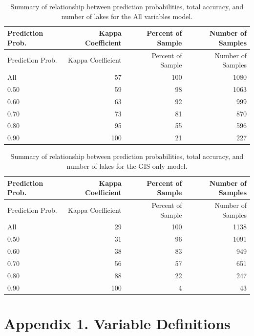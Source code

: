 \documentclass[12pt,]{article}
\begin{document}
\newpage

\begin{longtable}[c]{@{}lrrr@{}}
\caption{Summary of relationship between prediction probabilities, total
accuracy, and number of lakes for the All variables model.
\label{tab:cond_prob_tab_all}}\tabularnewline
\toprule
Prediction Prob. & Kappa Coefficient & Percent of Sample & Number of
Samples\tabularnewline
\midrule
\endfirsthead
\toprule
Prediction Prob. & Kappa Coefficient & Percent of Sample & Number of
Samples\tabularnewline
\midrule
\endhead
All & 57 & 100 & 1080\tabularnewline
0.50 & 59 & 98 & 1063\tabularnewline
0.60 & 63 & 92 & 999\tabularnewline
0.70 & 73 & 81 & 870\tabularnewline
0.80 & 95 & 55 & 596\tabularnewline
0.90 & 100 & 21 & 227\tabularnewline
\bottomrule
\end{longtable}

\newpage

\begin{longtable}[c]{@{}lrrr@{}}
\caption{Summary of relationship between prediction probabilities, total
accuracy, and number of lakes for the GIS only model.
\label{tab:cond_prob_tab_gis}}\tabularnewline
\toprule
Prediction Prob. & Kappa Coefficient & Percent of Sample & Number of
Samples\tabularnewline
\midrule
\endfirsthead
\toprule
Prediction Prob. & Kappa Coefficient & Percent of Sample & Number of
Samples\tabularnewline
\midrule
\endhead
All & 29 & 100 & 1138\tabularnewline
0.50 & 31 & 96 & 1091\tabularnewline
0.60 & 38 & 83 & 949\tabularnewline
0.70 & 56 & 57 & 651\tabularnewline
0.80 & 88 & 22 & 247\tabularnewline
0.90 & 100 & 4 & 43\tabularnewline
\bottomrule
\end{longtable}

\newpage

\section{Appendix 1. Variable
Definitions}\label{appendix-1.-variable-definitions}
\end{document}
